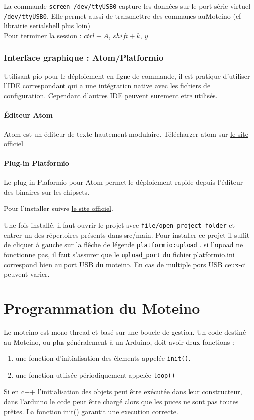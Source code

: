 \documentclass[a4paper]{report}
\begin{document}
La commande \verb+screen /dev/ttyUSB0+ capture les données sur le port série virtuel \verb+/dev/ttyUSB0+. Elle permet aussi de transmettre des commanes auMoteino (cf librairie serialshell plus loin)\\
Pour terminer la session : $ctrl+A$, $shift+k$, $y$

\subsection{Interface graphique : Atom/Platformio}

Utilisant pio pour le déploiement en ligne de commande, il est pratique d'utiliser l'IDE correspondant qui a une intégration native avec les fichiers de configuration. Cependant d'autres IDE peuvent surement etre utilisés.

\subsubsection{Éditeur Atom}

Atom est un éditeur de texte hautement modulaire.
Télécharger atom sur \href{https://atom.io/}{le site officiel}

\subsubsection{Plug-in Platformio}

Le plug-in Plaformio pour Atom permet le déploiement rapide depuis l'éditeur des binaires sur les chipsets.

Pour l'installer suivre \href{http://docs.platformio.org/en/stable/ide/atom.html#installation}{le site officiel}.

Une fois installé, il faut ouvrir le projet avec \verb+file/open project folder+ et entrer un des répertoires présents dans src/main. Pour installer ce projet il suffit de cliquer à gauche sur la flêche de légende \verb+platformio:upload+ . si l'upoad ne fonctionne pas, il faut s'assurer que le \verb+upload_port+ du fichier platformio.ini correspond bien au port USB du moteino. En cas de multiple pors USB ceux-ci peuvent varier.

\chapter{Programmation du Moteino}
\minitoc

Le moteino est mono-thread et basé sur une boucle de gestion. Un code destiné au Moteino, ou plus généralement à un Arduino, doit avoir deux fonctions :
\begin{enumerate}
\item une fonction d'initialisation des élements appelée \verb+init()+.
\item une fonction utilisée périodiquement appelée \verb+loop()+
\end{enumerate}
Si en c++ l'initialisation des objets peut être exécutée dans leur constructeur, dans l'arduino le code peut être chargé alors que les puces ne sont pas toutes prêtes. La fonction init() garantit une execution correcte.
\end{document}
